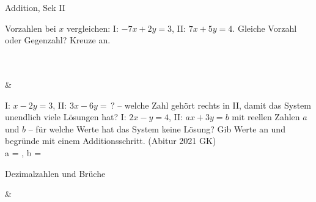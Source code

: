 \begin{aufgabe}{Addition, Sek II}
\begin{teile}
\teil Vorzahlen bei $x$ vergleichen: I: $-7x + 2y = 3$, II: $7x + 5y = 4$. Gleiche Vorzahl oder Gegenzahl? Kreuze an.\\ \\ \\ 
\end{teile}
\begin{gleichungsraster}[2]
 &
\end{gleichungsraster}
\begin{teile}
\teil I: $x - 2y = 3$, II: $3x - 6y = \,?$ – welche Zahl gehört rechts in II, damit das System unendlich viele Lösungen hat? \leerfeld
\teil I: $2x - y = 4$, II: $ax + 3y = b$ mit reellen Zahlen $a$ und $b$ – für welche Werte hat das System keine Lösung? Gib Werte an und begründe mit einem Additionsschritt. \hfill (Abitur 2021 GK) \\ a = \leerfeld , b = \leerfeld
\end{teile}
\end{aufgabe}

\begin{aufgabe}{Dezimalzahlen und Brüche}
\begin{gleichungsraster}[2]
 & \\
\end{gleichungsraster}
\end{aufgabe}

